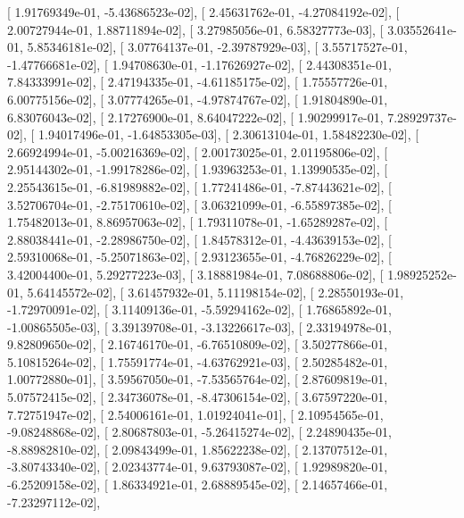 \documentclass{article}
\begin{document}
       [  1.91769349e-01,  -5.43686523e-02],
       [  2.45631762e-01,  -4.27084192e-02],
       [  2.00727944e-01,   1.88711894e-02],
       [  3.27985056e-01,   6.58327773e-03],
       [  3.03552641e-01,   5.85346181e-02],
       [  3.07764137e-01,  -2.39787929e-03],
       [  3.55717527e-01,  -1.47766681e-02],
       [  1.94708630e-01,  -1.17626927e-02],
       [  2.44308351e-01,   7.84333991e-02],
       [  2.47194335e-01,  -4.61185175e-02],
       [  1.75557726e-01,   6.00775156e-02],
       [  3.07774265e-01,  -4.97874767e-02],
       [  1.91804890e-01,   6.83076043e-02],
       [  2.17276900e-01,   8.64047222e-02],
       [  1.90299917e-01,   7.28929737e-02],
       [  1.94017496e-01,  -1.64853305e-03],
       [  2.30613104e-01,   1.58482230e-02],
       [  2.66924994e-01,  -5.00216369e-02],
       [  2.00173025e-01,   2.01195806e-02],
       [  2.95144302e-01,  -1.99178286e-02],
       [  1.93963253e-01,   1.13990535e-02],
       [  2.25543615e-01,  -6.81989882e-02],
       [  1.77241486e-01,  -7.87443621e-02],
       [  3.52706704e-01,  -2.75170610e-02],
       [  3.06321099e-01,  -6.55897385e-02],
       [  1.75482013e-01,   8.86957063e-02],
       [  1.79311078e-01,  -1.65289287e-02],
       [  2.88038441e-01,  -2.28986750e-02],
       [  1.84578312e-01,  -4.43639153e-02],
       [  2.59310068e-01,  -5.25071863e-02],
       [  2.93123655e-01,  -4.76826229e-02],
       [  3.42004400e-01,   5.29277223e-03],
       [  3.18881984e-01,   7.08688806e-02],
       [  1.98925252e-01,   5.64145572e-02],
       [  3.61457932e-01,   5.11198154e-02],
       [  2.28550193e-01,  -1.72970091e-02],
       [  3.11409136e-01,  -5.59294162e-02],
       [  1.76865892e-01,  -1.00865505e-03],
       [  3.39139708e-01,  -3.13226617e-03],
       [  2.33194978e-01,   9.82809650e-02],
       [  2.16746170e-01,  -6.76510809e-02],
       [  3.50277866e-01,   5.10815264e-02],
       [  1.75591774e-01,  -4.63762921e-03],
       [  2.50285482e-01,   1.00772880e-01],
       [  3.59567050e-01,  -7.53565764e-02],
       [  2.87609819e-01,   5.07572415e-02],
       [  2.34736078e-01,  -8.47306154e-02],
       [  3.67597220e-01,   7.72751947e-02],
       [  2.54006161e-01,   1.01924041e-01],
       [  2.10954565e-01,  -9.08248868e-02],
       [  2.80687803e-01,  -5.26415274e-02],
       [  2.24890435e-01,  -8.88982810e-02],
       [  2.09843499e-01,   1.85622238e-02],
       [  2.13707512e-01,  -3.80743340e-02],
       [  2.02343774e-01,   9.63793087e-02],
       [  1.92989820e-01,  -6.25209158e-02],
       [  1.86334921e-01,   2.68889545e-02],
       [  2.14657466e-01,  -7.23297112e-02],
\end{document}
